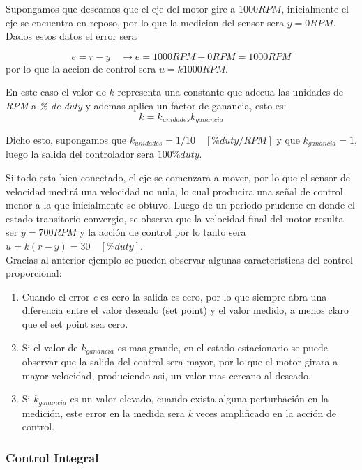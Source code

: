 \documentclass[10pt,conference,a4paper,onecolumn]{article}%
\begin{document}
Supongamos que deseamos que el eje del motor gire a $1000RPM$, inicialmente el eje se encuentra en reposo, por lo que la medicion del sensor sera $y=0RPM$. Dados estos datos el error sera

 \begin{equation*}
e=r-y \quad \rightarrow e=1000RPM - 0RPM =1000RPM
\end{equation*}
por lo que la accion de control sera $u=k 1000RPM$.

En este caso el valor de $k$ representa una constante que adecua las unidades de \textit{RPM} a \textit{\% de duty} y ademas aplica un factor de ganancia, esto es:
 \begin{equation*}
k=k_{unidades}k_{ganancia}
\end{equation*}
 
 Dicho esto, supongamos que $k_{unidades}=1/10 \quad [\%duty/RPM]$ y que $k_{ganancia}=1$, luego la salida del controlador sera $100 \%duty$.
 
 Si todo esta bien conectado, el eje se comenzara a mover, por lo que el sensor de velocidad medirá una velocidad no nula, lo cual producira una señal de control menor a la que inicialmente se obtuvo. Luego de un periodo prudente en donde el estado transitorio convergio, se observa que la velocidad final del motor resulta ser $y=700RPM$ y la acción de control por lo tanto sera $u=k(r-y)=30\quad [\%duty]$. \\
 
 
 Gracias al anterior ejemplo se pueden observar algunas características del control proporcional:
 \begin{enumerate}
 \item \label{item_prop} Cuando el error \textit{e} es cero la salida es cero, por lo que siempre abra una diferencia entre el valor deseado (set point) y el valor medido, a menos claro que el set point sea cero.
 \item Si el valor de $k_{ganancia}$ es mas grande, en el estado estacionario se puede observar que la salida del control sera mayor, por lo que el motor girara a mayor velocidad, produciendo asi, un valor mas cercano al deseado.
 \item Si $k_{ganancia}$ es un valor elevado, cuando exista alguna perturbación en la medición, este error en la medida sera \textit{k} veces amplificado en la acción de control. 
 \end{enumerate}
 
 
 \subsubsection{Control Integral}
\end{document}
